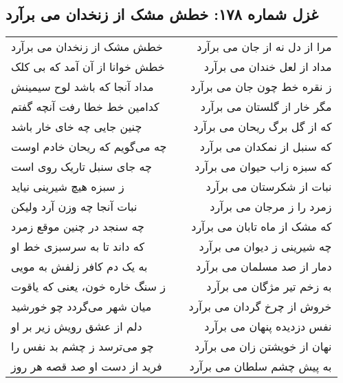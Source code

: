 \begin{center}
\section*{غزل شماره ۱۷۸: خطش مشک از زنخدان می برآرد}
\label{sec:178}
\begin{longtable}{l p{0.5cm} r}
خطش مشک از زنخدان می برآرد
&&
مرا از دل نه از جان می برآرد
\\
خطش خوانا از آن آمد که بی کلک
&&
مداد از لعل خندان می برآرد
\\
مداد آنجا که باشد لوح سیمینش
&&
ز نقره خط چون جان می برآرد
\\
کدامین خط خطا رفت آنچه گفتم
&&
مگر خار از گلستان می برآرد
\\
چنین جایی چه خای خار باشد
&&
که از گل برگ ریحان می برآرد
\\
چه می‌گویم که ریحان خادم اوست
&&
که سنبل از نمکدان می برآرد
\\
چه جای سنبل تاریک روی است
&&
که سبزه زاب حیوان می برآرد
\\
ز سبزه هیچ شیرینی نیاید
&&
نبات از شکرستان می برآرد
\\
نبات آنجا چه وزن آرد ولیکن
&&
زمرد را ز مرجان می برآرد
\\
چه سنجد در چنین موقع زمرد
&&
که مشک از ماه تابان می برآرد
\\
که داند تا به سرسبزی خط او
&&
چه شیرینی ز دیوان می برآرد
\\
به یک دم کافر زلفش به مویی
&&
دمار از صد مسلمان می برآرد
\\
ز سنگ خاره خون، یعنی که یاقوت
&&
به زخم تیر مژگان می برآرد
\\
میان شهر می‌گردد چو خورشید
&&
خروش از چرخ گردان می برآرد
\\
دلم از عشق رویش زیر بر او
&&
نفس دزدیده پنهان می برآرد
\\
چو می‌ترسد ز چشم بد نفس را
&&
نهان از خویشتن زان می برآرد
\\
فرید از دست او صد قصه هر روز
&&
به پیش چشم سلطان می برآرد
\\
\end{longtable}
\end{center}
